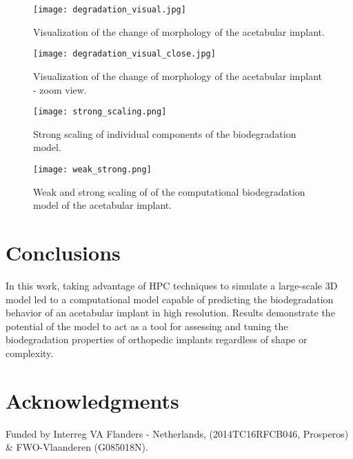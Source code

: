 \begin{figure}[h]
\centering
\medskip
\texttt{[image: degradation\_visual.jpg]}
\caption[Visualization of the change of morphology of the acetabular implant]{Visualization of the change of morphology of the acetabular implant.} \label{fig:cup_degradation_visual}
\end{figure}

\begin{figure}[h]
\centering
\medskip
\texttt{[image: degradation\_visual\_close.jpg]}
\caption[Visualization of the change of morphology of the acetabular implant]{Visualization of the change of morphology of the acetabular implant - zoom view.} \label{fig:cup_degradation_visual_close}
\end{figure}

\begin{figure}[h]
\centering
\medskip
\texttt{[image: strong\_scaling.png]}
\caption[Strong scaling of individual components of the biodegradation model]{Strong scaling of individual components of the biodegradation model.} \label{fig:cup_strong_scaling}
\end{figure}


\begin{figure}[h]
\centering
\medskip
\texttt{[image: weak\_strong.png]}
\caption[Weak and strong scaling of of the acetabular implant model]{Weak and strong scaling of of the computational biodegradation model of the acetabular implant.} \label{fig:cup_weak_strong}
\end{figure}

\section{Conclusions}

In this work, taking advantage of HPC techniques to simulate a large-scale 3D model led to a computational model capable of predicting the biodegradation behavior of an acetabular implant in high resolution. Results demonstrate the potential of the model to act as a tool for assessing and tuning the biodegradation properties of orthopedic  implants regardless of shape or complexity.

\section{Acknowledgments}

Funded by Interreg VA Flanders - Netherlands, (2014TC16RFCB046, Prosperos) \& FWO-Vlaanderen (G085018N).

